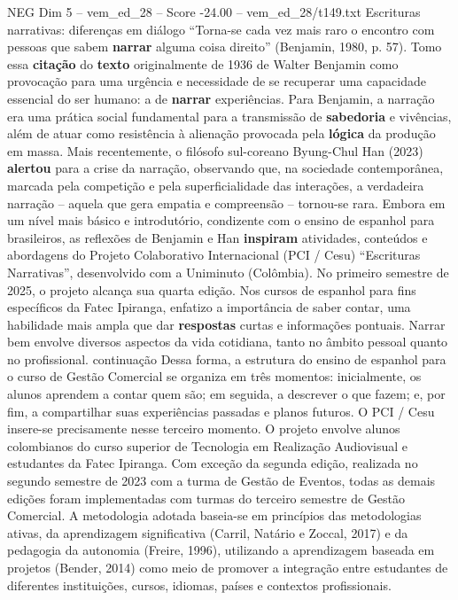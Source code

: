 \begin{textsample}{NEG Dim 5 – vem\_ed\_28 – Score -24.00 – vem\_ed\_28/t149.txt}  \label{ex:f5_neg_001}
Escrituras narrativas: diferenças em diálogo “Torna-se cada vez mais raro o encontro com pessoas que sabem \textbf{narrar} alguma coisa direito” (Benjamin, 1980, p. 57).
Tomo essa \textbf{citação} do \textbf{texto} originalmente de 1936 de Walter Benjamin como provocação para uma urgência e necessidade de se recuperar uma capacidade essencial do ser humano: a de \textbf{narrar} experiências.
Para Benjamin, a narração era uma prática social fundamental para a transmissão de \textbf{sabedoria} e vivências, além de atuar como resistência à alienação provocada pela \textbf{lógica} da produção em massa.
Mais recentemente, o filósofo sul-coreano Byung-Chul Han (2023) \textbf{alertou} para a crise da narração, observando que, na sociedade contemporânea, marcada pela competição e pela superficialidade das interações, a verdadeira narração – aquela que gera empatia e compreensão – tornou-se rara.
Embora em um nível mais básico e introdutório, condizente com o ensino de espanhol para brasileiros, as reflexões de Benjamin e Han \textbf{inspiram} atividades, conteúdos e abordagens do Projeto Colaborativo Internacional (PCI / Cesu) “Escrituras Narrativas”, desenvolvido com a Uniminuto (Colômbia).
No primeiro semestre de 2025, o projeto alcança sua quarta edição.
Nos cursos de espanhol para fins específicos da Fatec Ipiranga, enfatizo a importância de saber contar, uma habilidade mais ampla que dar \textbf{respostas} curtas e informações pontuais.
Narrar bem envolve diversos aspectos da vida cotidiana, tanto no âmbito pessoal quanto no profissional. continuação Dessa forma, a estrutura do ensino de espanhol para o curso de Gestão Comercial se organiza em três momentos: inicialmente, os alunos aprendem a contar quem são; em seguida, a descrever o que fazem; e, por fim, a compartilhar suas experiências passadas e planos futuros.
O PCI / Cesu insere-se precisamente nesse terceiro momento.
O projeto envolve alunos colombianos do curso superior de Tecnologia em Realização Audiovisual e estudantes da Fatec Ipiranga.
Com exceção da segunda edição, realizada no segundo semestre de 2023 com a turma de Gestão de Eventos, todas as demais edições foram implementadas com turmas do terceiro semestre de Gestão Comercial.
A metodologia adotada baseia-se em princípios das metodologias ativas, da aprendizagem significativa (Carril, Natário e Zoccal, 2017) e da pedagogia da autonomia (Freire, 1996), utilizando a aprendizagem baseada em projetos (Bender, 2014) como meio de promover a integração entre estudantes de diferentes instituições, cursos, idiomas, países e contextos profissionais.

\end{textsample}
